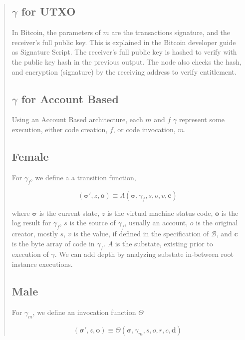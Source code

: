 \documentclass[12pt, titlepage, twocolumn]{report}
\begin{document}
\begin{quotation}
\subsection{\(\gamma\) for UTXO}
In Bitcoin, the parameters of \(m\) are the transactions signature, and the receiver's full public key. This is explained in the Bitcoin developer guide as Signature Script. The receiver's full public key is hashed to verify with the public key hash in the previous output. The node also checks the hash, and encryption (signature) by the receiving address to verify entitlement.


\subsection{\(\gamma\) for Account Based} \label{accbase}
Using an Account Based architecture, each \(m\) and \(f\) \(\gamma\) represent some execution, either code creation, \(f\), or code invocation, \(m\).

\subsection{Female}
For \(\gamma_f\), we define a a transition function,


\begin{equation}
(\boldsymbol{\sigma}', z, \boldsymbol{o}) \equiv \Lambda(\boldsymbol{\sigma}, \gamma_f, s, o, v, \mathbf{c})
\end{equation}

where \(\boldsymbol{\sigma}\) is the current state, \(z\) is the virtual machine status code, \(\boldsymbol{o}\) is the log result for \(\gamma_f\), \(s\) is the source of \(\gamma_f\), usually an account, \(o\) is the original creator, mostly \(s\), \(v\) is the value, if defined in the specification of \( \boldsymbol{\mathcal{B}} \), and \(\mathbf{c}\) is the byte array of code in \(\gamma_f\). \(A\) is the substate, existing prior to execution of \(\gamma\). We can add depth by analyzing substate in-between root instance executions.


\subsection{Male}

For \(\gamma_m\), we define an invocation function \(\Theta\)

\begin{equation}
(\boldsymbol{\sigma}', z, \boldsymbol{o}) \equiv \Theta(\boldsymbol{\sigma}, \gamma_m, s, o, r, c, \mathbf{d})
\end{equation}


\end{quotation}
\end{document}
